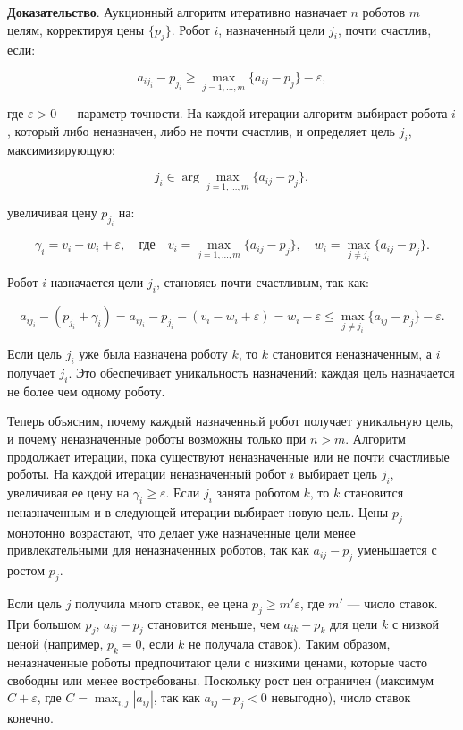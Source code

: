 \textbf{Доказательство}. Аукционный алгоритм итеративно назначает \( n \) роботов \( m \) целям, корректируя цены \( \{p_j\} \). Робот \( i \), назначенный цели \( j_i \), почти счастлив, если:

\[
a_{i j_i} - p_{j_i} \geq \max_{j=1,\ldots,m} \{a_{ij} - p_j\} - \varepsilon,
\]

где \( \varepsilon > 0 \) — параметр точности. На каждой итерации алгоритм выбирает робота \( i \), который либо неназначен, либо не почти счастлив, и определяет цель \( j_i \), максимизирующую:

\[
j_i \in \arg \max_{j=1,\ldots,m} \{a_{ij} - p_j\},
\]

увеличивая цену \( p_{j_i} \) на:

\[
\gamma_i = v_i - w_i + \varepsilon, \quad \text{где} \quad v_i = \max_{j=1,\ldots,m} \{a_{ij} - p_j\}, \quad w_i = \max_{j \neq j_i} \{a_{ij} - p_j\}.
\]

Робот \( i \) назначается цели \( j_i \), становясь почти счастливым, так как:

\[
a_{i j_i} - (p_{j_i} + \gamma_i) = a_{i j_i} - p_{j_i} - (v_i - w_i + \varepsilon) = w_i - \varepsilon \leq \max_{j \neq j_i} \{a_{ij} - p_j\} - \varepsilon.
\]

Если цель \( j_i \) уже была назначена роботу \( k \), то \( k \) становится неназначенным, а \( i \) получает \( j_i \). Это обеспечивает уникальность назначений: каждая цель назначается не более чем одному роботу.

Теперь объясним, почему каждый назначенный робот получает уникальную цель, и почему неназначенные роботы возможны только при \( n > m \). Алгоритм продолжает итерации, пока существуют неназначенные или не почти счастливые роботы. На каждой итерации неназначенный робот \( i \) выбирает цель \( j_i \), увеличивая ее цену на \( \gamma_i \geq \varepsilon \). Если \( j_i \) занята роботом \( k \), то \( k \) становится неназначенным и в следующей итерации выбирает новую цель. Цены \( p_j \) монотонно возрастают, что делает уже назначенные цели менее привлекательными для неназначенных роботов, так как \( a_{ij} - p_j \) уменьшается с ростом \( p_j \).

Если цель \( j \) получила много ставок, ее цена \( p_j \geq m' \varepsilon \), где \( m' \) — число ставок. При большом \( p_j \), \( a_{ij} - p_j \) становится меньше, чем \( a_{ik} - p_k \) для цели \( k \) с низкой ценой (например, \( p_k = 0 \), если \( k \) не получала ставок). Таким образом, неназначенные роботы предпочитают цели с низкими ценами, которые часто свободны или менее востребованы. Поскольку рост цен ограничен (максимум \( C + \varepsilon \), где \( C = \max_{i,j} |a_{ij}| \), так как \( a_{ij} - p_j < 0 \) невыгодно), число ставок конечно.

